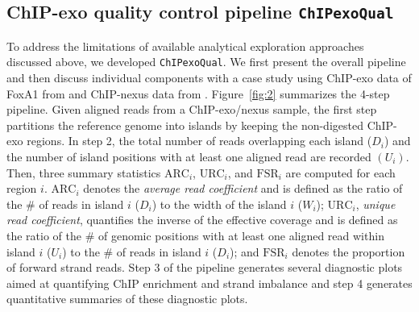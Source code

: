 \documentclass{bmcart}
\newcommand{\pname}[1]{\texttt{ChIPexoQual}}
\begin{document}

\subsection*{ChIP-exo quality control pipeline \pname{}}

To address the limitations of available analytical exploration approaches discussed above, we developed \pname{}. We first present the overall pipeline and then discuss individual components with a case study using ChIP-exo data of FoxA1 from \cite{exoillumina} and ChIP-nexus data from \cite{chipnexus}. Figure~\ref{fig:2} summarizes the 4-step pipeline.  Given aligned reads from a ChIP-exo/nexus sample, the first step partitions the reference genome into islands by keeping the non-digested ChIP-exo regions. In step 2, the total number of reads overlapping each island ($D_i$) and the number of island positions with at least one aligned read are recorded $(U_i)$. Then, three summary statistics $\text{ARC}_i$, $\text{URC}_i$, and $\text{FSR}_i$ are computed for each region $i$. $\text{ARC}_i$ denotes the \textit{average read coefficient} and is defined as the ratio of the \# of reads in island $i$ ($D_i$) to the width of the island $i$ ($W_i$); $\text{URC}_i$, \textit{unique read coefficient}, quantifies the inverse of the effective coverage and is defined as the ratio of the \# of genomic positions with at least one aligned read within island $i$ ($U_i$) to the \# of reads in island $i$ ($D_i$); and $\text{FSR}_i$ denotes the proportion of forward strand reads. Step 3 of the pipeline generates several diagnostic plots aimed at quantifying ChIP enrichment and strand imbalance and step 4 generates quantitative summaries of these diagnostic plots.
\end{document}
